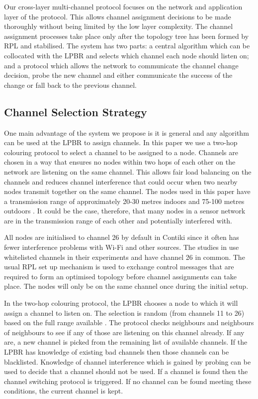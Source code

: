 Our cross-layer multi-channel protocol focuses on the network and application layer of the protocol. This allows channel assignment decisions to be made thoroughly without being limited by the low layer complexity. The channel assignment processes take place only after the topology tree has been formed by RPL and stabilised. The system has two parts: a central algorithm which can be collocated with the LPBR and selects which channel each node should listen on; and a protocol which allows the network to communicate the channel change decision, probe the new channel and either communicate the success of the change or fall back to the previous channel. 

\subsection{Channel Selection Strategy}

One main advantage of the system we propose is it is general and any algorithm can be used at the LPBR to assign channels. In this paper we use a two-hop colouring protocol to select a channel to be assigned to a node. Channels are chosen in a way that ensures no nodes within two hops of each other on the network are listening on the same channel.
This allows fair load balancing on the channels and reduces channel interference that could occur when two nearby nodes transmit together on the same channel. The nodes used in this paper have a transmission range of approximately 20-30 metres indoors and 75-100 metres outdoors \cite{telosb-datasheet}. It could be the case, therefore, that many nodes in a sensor network are in the transmission range of each other and potentially interfered with.
 
All nodes are initialised to channel 26 by default in Contiki since it often has fewer interference problems with Wi-Fi and other sources. The studies in \cite{chrysso, micmac, watteyne} use whitelisted channels in their experiments and have channel 26 in common. The usual RPL set up mechanism is used to exchange control messages that are required to form an optimised topology before channel assignments can take place. The nodes will only be on the same channel once during the initial setup.  
	
In the two-hop colouring protocol, the LPBR chooses a node to which it will assign a channel to listen on. The selection is random (from channels 11 to 26) based on the full range available \cite{ieee802.15.4}. The protocol checks neighbours and neighbours of neighbours to see if any of those are listening on this channel already. If any are, a new channel is picked from the remaining list of available channels. If the LPBR has knowledge of existing bad channels then those channels can be blacklisted.  Knowledge of channel interference which is gained by probing can be used to decide that a channel should not be used. If a channel is found then the channel switching protocol is triggered. If no channel can be found meeting these conditions, the current channel is kept.  

